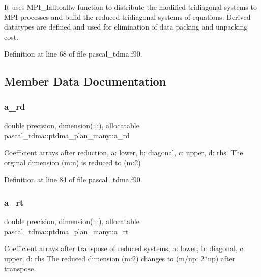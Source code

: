 It uses M\+P\+I\+\_\+\+Ialltoallw function to distribute the modified tridiagonal systems to M\+PI processes and build the reduced tridiagonal systems of equations. Derived datatypes are defined and used for elimination of data packing and unpacking cost. 

Definition at line 68 of file pascal\+\_\+tdma.\+f90.



\subsection{Member Data Documentation}
\mbox{\label{structpascal__tdma_1_1ptdma__plan__many_a6d9101716eca623dc8c45075788f06bd}} 
\subsubsection{\texorpdfstring{a\_rd}{a\_rd}}
{\footnotesize\ttfamily double precision, dimension(\+:,\+:), allocatable pascal\+\_\+tdma\+::ptdma\+\_\+plan\+\_\+many\+::a\+\_\+rd}



Coefficient arrays after reduction, a\+: lower, b\+: diagonal, c\+: upper, d\+: rhs. The orginal dimension (m\+:n) is reduced to (m\+:2) 



Definition at line 84 of file pascal\+\_\+tdma.\+f90.

\mbox{\label{structpascal__tdma_1_1ptdma__plan__many_a42be039aee75c5393c22111cf232e77d}} 
\subsubsection{\texorpdfstring{a\_rt}{a\_rt}}
{\footnotesize\ttfamily double precision, dimension(\+:,\+:), allocatable pascal\+\_\+tdma\+::ptdma\+\_\+plan\+\_\+many\+::a\+\_\+rt}



Coefficient arrays after transpose of reduced systems, a\+: lower, b\+: diagonal, c\+: upper, d\+: rhs The reduced dimension (m\+:2) changes to (m/np\+: 2$\ast$np) after transpose. 



